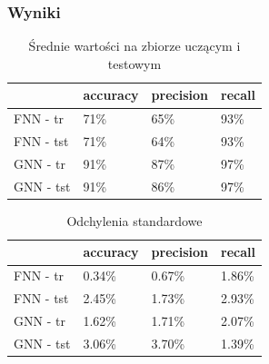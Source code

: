 \documentclass{beamer}
\begin{document}
\begin{frame}
\frametitle{Wyniki}
\setlength{\tabcolsep}{2pt}
\begin{table}[h!]
	\begin{center}
	\begin{tabular}{llll}
	\toprule
	& accuracy & precision & recall \\
	\midrule
	FNN - tr &	71\% &  65\% & 93\% \\
	FNN - tst &	71\% &  64\% &  93\% \\
	GNN - tr &	91\% &  87\%&  97\% \\
	GNN - tst &	91\% &  86\% &  97\% \\
	\bottomrule
	\end{tabular}
	\caption{Średnie wartości na zbiorze uczącym i testowym}
	\end{center}
\end{table}

\begin{table}[h!]
	\begin{center}
	\begin{tabular}{llll}
	\toprule
	& accuracy & precision & recall \\
	\midrule
	FNN - tr &	0.34\% &  0.67\% & 1.86\% \\
	FNN - tst &	2.45\% &  1.73\% &  2.93\% \\
	GNN - tr &	1.62\% &  1.71\% &  2.07\% \\
	GNN - tst &	3.06\% &  3.70\% &  1.39\% \\
	\bottomrule
	\end{tabular}
	\caption{Odchylenia standardowe}
	\end{center}
\end{table}
\end{frame}
\end{document}
